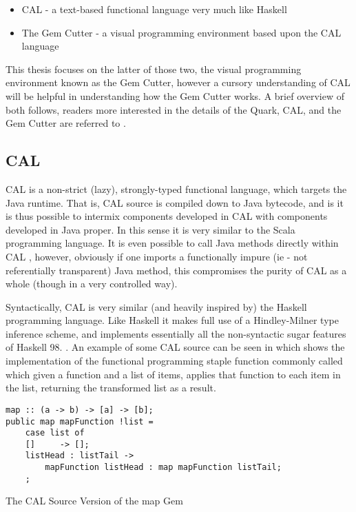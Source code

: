 \begin{itemize}
	\item CAL - a text-based functional language very much like Haskell
	\item The Gem Cutter - a visual programming environment based upon the CAL language
\end{itemize}

This thesis focuses on the latter of those two, the visual programming environment known as the Gem Cutter, however a cursory understanding of CAL will be helpful in understanding how the Gem Cutter works.  A brief overview of both follows, readers more interested in the details of the Quark, CAL, and the Gem Cutter are referred to \cite{evans06, evans07}.

\subsection{CAL}

CAL is a non-strict (lazy), strongly-typed functional language, which targets the Java runtime.  That is, CAL source is compiled down to Java bytecode, and is it is thus possible to intermix components developed in CAL with components developed in Java proper.  In this sense it is very similar to the Scala programming language\cite{scala}.  It is even possible to call Java methods directly within CAL \cite{javaMeetsQuark}, however, obviously if one imports a functionally impure (ie - not referentially transparent) Java method, this compromises the purity of CAL as a whole (though in a very controlled way).  

Syntactically, CAL is very similar (and heavily inspired by) the Haskell programming language.  Like Haskell it makes full use of a Hindley-Milner type inference scheme, and implements essentially all the non-syntactic sugar features of Haskell 98. \cite{evans07, Ilic07}.  An example of some CAL source can be seen in  which shows the implementation of the functional programming staple function commonly called  which given a function and a list of items, applies that function to each item in the list, returning the transformed list as a result.  


\begin{program}
\begin{verbatim}
map :: (a -> b) -> [a] -> [b]; 
public map mapFunction !list = 
    case list of 
    []     -> []; 
    listHead : listTail ->  
        mapFunction listHead : map mapFunction listTail; 
    ; 
\end{verbatim}
\caption{The CAL Source Version of the map Gem}
\label{prog:calmap}
\end{program}

